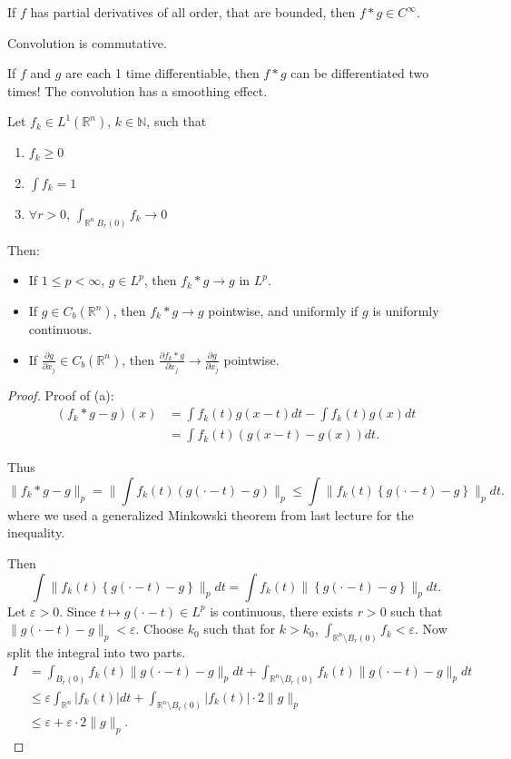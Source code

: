 \begin{corollary}
	If $f$ has partial derivatives of all order, that are bounded, then $f* g \in C^{\infty }$.
\end{corollary}

\begin{theorem}
	Convolution is commutative.
\end{theorem}

If $f$ and $g$ are each 1 time differentiable, then $f*g$ can be differentiated two times! The convolution has a smoothing effect.

\begin{theorem}
	Let $f_k \in L^1(\mathbb{R}^n)$, $k \in \mathbb{N}$, such that
	\begin{enumerate}
		\item $f_k \ge 0$ 
		\item $\int f_k = 1$
		\item $\forall r > 0$, $\int _{\mathbb{R}^n\ B_r(0)} f_k \to  0$
	\end{enumerate}
	Then:
	\begin{itemize}
		\item If $1 \le p < \infty $, $g \in L^p$, then $f_k * g \to  g$ in $L^p$.
		\item If $g \in C_b(\mathbb{R}^n)$, then $f_k * g \to  g$ pointwise, and uniformly if $g$ is uniformly continuous.
		\item If $\frac{\partial g}{\partial x_j}  \in C_b(\mathbb{R}^n)$, then $\frac{\partial f_k * g}{\partial x_j}  \to  \frac{\partial g}{\partial x_j} $ pointwise.
	\end{itemize}
\end{theorem}
\begin{proof}
	Proof of (a): 
	\begin{align*}
		(f_k * g - g)(x)
		&= \int f_k (t) g(x-t) dt - \int  f_k (t) g(x) dt \\
		&= \int f_k(t) \left( g(x-t) - g(x)  \right) dt 
	.\end{align*}

	Thus 
	\[
		\|f_k * g - g\|_p = \|\int f_k (t) \left( g(\cdot - t) - g \right) \|_p
		\le \int  \|f_k(t) \left\{ g(\cdot  - t) - g \right\} \|_p d t
	.\] 
	where we used a generalized Minkowski theorem from last lecture for the inequality.

	Then
	\[
		\int  \|f_k(t) \left\{ g(\cdot  - t) - g \right\} \|_p d t = 
\int  f_k(t) \| \left\{ g(\cdot  - t) - g \right\} \|_p d t
	.\] 
	Let $\varepsilon>0$. Since $t \mapsto g(\cdot - t) \in L^p$ is continuous, there exists $r > 0$ such that $\|g(\cdot - t) - g\|_p < \varepsilon$. Choose $k_0$ such that for $k > k_0$, $\int _{\mathbb{R}^n \setminus B_r(0)}f_k < \varepsilon$. Now split the integral into two parts.
	\begin{align*}
		I &= \int _{B_r(0)} f_k(t) \|g(\cdot - t) - g\|_p d t +  \int _{\mathbb{R}^n \setminus B_r(0)} f_k(t) \|g(\cdot - t) - g\|_p d t  \\
		&\le \varepsilon \int _{\mathbb{R}^n} |f_k(t)| d t + \int _{\mathbb{R}^n \setminus B_r(0)} |f_k(t)| \cdot 2 \|g\|_p \\
		&\le \varepsilon + \varepsilon \cdot 2 \|g\|_p
	.\end{align*}
\end{proof}


